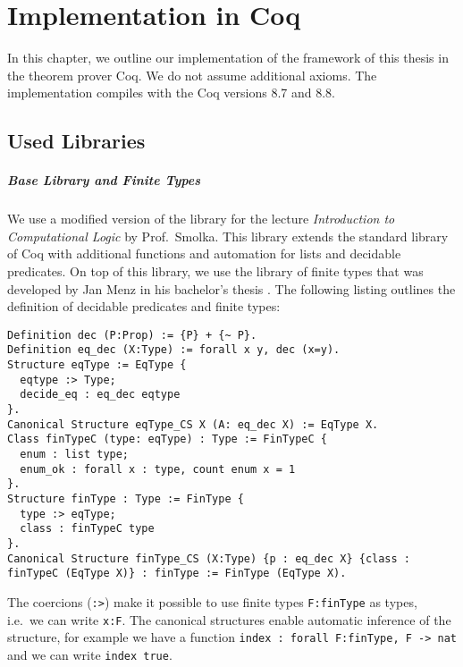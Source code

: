 \chapter{Implementation in Coq}
\label{chap:implementation}

\lstset{style=coq}

In this chapter, we outline our implementation of the framework of this thesis in the theorem prover Coq.  We do not assume
additional axioms.  The implementation compiles with the Coq versions 8.7 and 8.8.

\section{Used Libraries}
\label{sec:coq-libraries}

\paragraph{Base Library and Finite Types}

We use a modified version of the library for the lecture \textit{Introduction to Computational Logic} by Prof.\ Smolka.  This library extends the
standard library of Coq with additional functions and automation for lists and decidable predicates.  On top of this library, we use the library of
finite types that was developed by Jan Menz in his bachelor's thesis \cite{JanMenz}.  The following listing outlines the definition of decidable
predicates and finite types:

\begin{lstlisting}
Definition dec (P:Prop) := {P} + {~ P}.
Definition eq_dec (X:Type) := forall x y, dec (x=y).
Structure eqType := EqType {
  eqtype :> Type;
  decide_eq : eq_dec eqtype
}.
Canonical Structure eqType_CS X (A: eq_dec X) := EqType X.
Class finTypeC (type: eqType) : Type := FinTypeC {
  enum : list type;
  enum_ok : forall x : type, count enum x = 1
}.
Structure finType : Type := FinType {
  type :> eqType;
  class : finTypeC type
}.
Canonical Structure finType_CS (X:Type) {p : eq_dec X} {class : finTypeC (EqType X)} : finType := FinType (EqType X).
\end{lstlisting}%

The coercions (\lstinline!:>!) make it possible to use finite types \lstinline{F:finType} as types, i.e.\ we can write \lstinline!x:F!.  The canonical
structures enable automatic inference of the structure, for example we have a function \lstinline!index : forall F:finType, F -> nat! and we can write
\lstinline!index true!.

